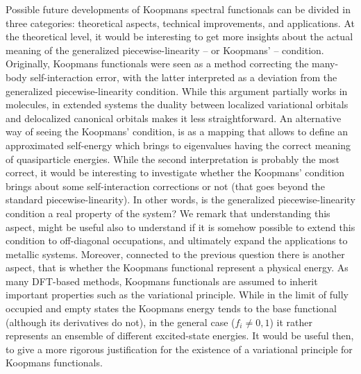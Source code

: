 Possible future developments of Koopmans spectral functionals can be divided in three categories: theoretical aspects, technical improvements, and applications. At the theoretical level, it would be interesting to get more insights about the actual meaning of the generalized piecewise-linearity -- or Koopmans' -- condition. Originally, Koopmans functionals were seen as a method correcting the many-body self-interaction error, with the latter interpreted as a deviation from the generalized piecewise-linearity condition. While this argument partially works in molecules, in extended systems the duality between localized variational orbitals and delocalized canonical orbitals makes it less straightforward. An alternative way of seeing the Koopmans' condition, is as a mapping that allows to define an approximated self-energy which brings to eigenvalues having the correct meaning of quasiparticle energies. While the second interpretation is probably the most correct, it would be interesting to investigate whether the Koopmans' condition brings about some self-interaction corrections or not (that goes beyond the standard piecewise-linearity). In other words, is the generalized piecewise-linearity condition a real property of the system? We remark that understanding this aspect, might be useful also to understand if it is somehow possible to extend this condition to off-diagonal occupations, and ultimately expand the applications to metallic systems. Moreover, connected to the previous question there is another aspect, that is whether the Koopmans functional represent a physical energy. As many DFT-based methods, Koopmans functionals are assumed to inherit important properties such as the variational principle. While in the limit of fully occupied and empty states the Koopmans energy tends to  the base functional (although its derivatives do not), in the general case ($f_i \neq 0,1$) it rather represents an ensemble of different excited-state energies. It would be useful then, to give a more rigorous justification for the existence of a variational principle for Koopmans functionals.

